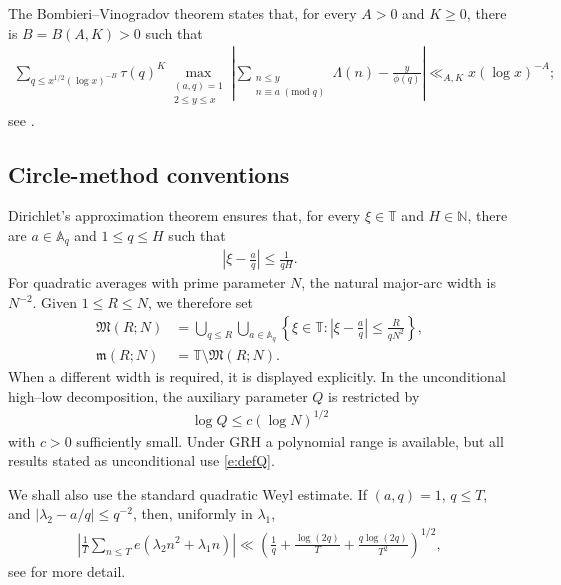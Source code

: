 \documentclass[12pt,reqno]{amsart}
\numberwithin{equation}{section}
\theoremstyle{definition}
\theoremstyle{remark}
\begin{document}
The Bombieri--Vinogradov theorem states that, for every \(A>0\) and \(K\geq0\), there is
\(B=B(A,K)>0\) such that
\begin{align}\label{e:BVstandard}
 \sum_{q\leq x^{1/2}(\log x)^{-B}}
 \tau(q)^K
 \max_{\substack{(a,q)=1\\2\leq y\leq x}}
 \left|
 \sum_{\substack{n\leq y\\n\equiv a\;(\mathrm{mod}\;q)}}\Lambda(n)
 -\frac{y}{\phi(q)}
 \right|
 \ll_{A,K}x(\log x)^{-A};
\end{align}
see \cite[Theorem~17.1]{iwaniec}. 


\subsection{Circle-method conventions}

Dirichlet's approximation theorem ensures that, for every
$\xi\in\mathbb T$ and $H\in \mathbb{N}$, there are
$a\in\mathbb A_q$ and $1\leq q\leq H$ such that
\begin{align}\label{e:Dirichletapprox}
 \left|\xi-\frac aq\right|\leq\frac1{qH}.
\end{align}
For quadratic averages with prime parameter $N$, the natural
major-arc width is $N^{-2}$.  Given $1\leq R\leq N$, we therefore set
\begin{align}\label{e:majorDef}
 \mathfrak M(R;N)
 &=\bigcup_{q\leq R}\bigcup_{a\in\mathbb A_q}
 \left\{\xi\in\mathbb T:
 \left|\xi-\frac aq\right|\leq\frac{R}{qN^2}\right\},\\
 \mathfrak m(R;N)&=\mathbb T\setminus\mathfrak M(R;N).
\end{align}
When a different width is required, it is displayed explicitly.  In
the unconditional high--low decomposition, the auxiliary parameter
$Q$ is restricted by
\begin{align}\label{e:defQ}
 \log Q\leq c(\log N)^{1/2}
\end{align}
with $c>0$ sufficiently small.  Under GRH a polynomial range is
available, but all results stated as unconditional use
\eqref{e:defQ}.

We shall also use the standard quadratic Weyl estimate.  If
$(a,q)=1$, $q\leq T$, and $|\lambda_2-a/q|\leq q^{-2}$, then, uniformly
in $\lambda_1$,
\begin{align}\label{vandercorput}
 \left|\frac1T\sum_{n\leq T}e(\lambda_2n^2+\lambda_1n)\right|
 \ll\left(\frac1q+\frac{\log(2q)}T
              +\frac{q\log(2q)}{T^2}\right)^{1/2},
\end{align}
see
\cite[Section~8.2]{iwaniec} for more detail. 
\end{document}
